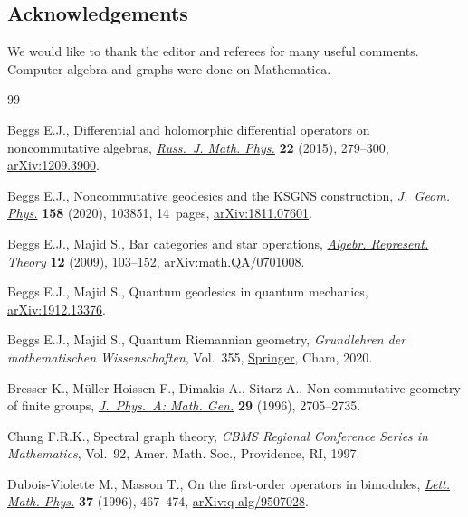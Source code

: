 \documentclass[pdftex]{sigma}
\numberwithin{equation}{section}
\newcommand{\<}{\langle}
\renewcommand{\>}{\rangle}
\begin{document}
\subsection*{Acknowledgements}

We would like to thank the editor and referees for many useful comments. Computer algebra and graphs were done on Mathematica.

\begin{thebibliography}{99}
\footnotesize\itemsep=0pt

Beggs E.J., Differential and holomorphic differential operators on
 noncommutative algebras, \href{https://doi.org/10.1134/S1061920815030012}{\textit{Russ.~J. Math. Phys.}} \textbf{22} (2015),
 279--300, \href{https://arxiv.org/abs/1209.3900}{arXiv:1209.3900}.

Beggs E.J., Noncommutative geodesics and the {KSGNS} construction,
 \href{https://doi.org/10.1016/j.geomphys.2020.103851}{\textit{J.~Geom. Phys.}} \textbf{158} (2020), 103851, 14~pages, \href{https://arxiv.org/abs/1811.07601}{arXiv:1811.07601}.

Beggs E.J., Majid S., Bar categories and star operations, \href{https://doi.org/10.1007/s10468-009-9141-x}{\textit{Algebr.
 Represent. Theory}} \textbf{12} (2009), 103--152, \href{https://arxiv.org/abs/math.QA/0701008}{arXiv:math.QA/0701008}.

Beggs E.J., Majid S., Quantum geodesics in quantum mechanics,
 \href{https://arxiv.org/abs/1912.13376}{arXiv:1912.13376}.

Beggs E.J., Majid S., Quantum {R}iemannian geometry, \textit{Grundlehren der
 mathematischen Wissenschaften}, Vol.~355, \href{https://doi.org/10.1007/978-3-030-30294-8}{Springer}, Cham, 2020.

Bresser K., M\"uller-Hoissen F., Dimakis A., Sitarz A., Non-commutative
 geometry of finite groups, \href{https://doi.org/10.1088/0305-4470/29/11/010}{\textit{J.~Phys.~A: Math. Gen.}} \textbf{29}
 (1996), 2705--2735.

Chung F.R.K., Spectral graph theory, \textit{CBMS Regional Conference Series in
 Mathematics}, Vol.~92, Amer. Math. Soc., Providence, RI, 1997.

Dubois-Violette M., Masson T., On the first-order operators in bimodules,
 \href{https://doi.org/10.1007/BF00312677}{\textit{Lett. Math. Phys.}} \textbf{37} (1996), 467--474,
 \href{https://arxiv.org/abs/q-alg/9507028}{arXiv:q-alg/9507028}.


\end{thebibliography}
\end{document}
